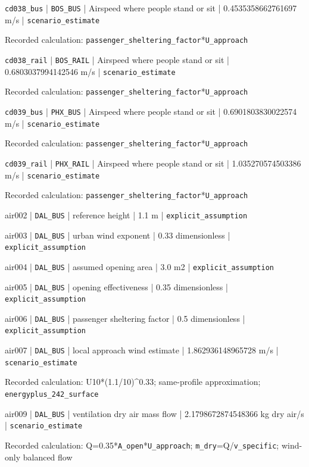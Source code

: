 \nolinkurl{cd038_bus} | \nolinkurl{BOS_BUS} | Airspeed where people stand or sit | 0.4535358662761697 m/s | \nolinkurl{scenario_estimate}

Recorded calculation: \nolinkurl{passenger_sheltering_factor}*\nolinkurl{U_approach}

\nolinkurl{cd038_rail} | \nolinkurl{BOS_RAIL} | Airspeed where people stand or sit | 0.6803037994142546 m/s | \nolinkurl{scenario_estimate}

Recorded calculation: \nolinkurl{passenger_sheltering_factor}*\nolinkurl{U_approach}

\nolinkurl{cd039_bus} | \nolinkurl{PHX_BUS} | Airspeed where people stand or sit | 0.6901803830022574 m/s | \nolinkurl{scenario_estimate}

Recorded calculation: \nolinkurl{passenger_sheltering_factor}*\nolinkurl{U_approach}

\nolinkurl{cd039_rail} | \nolinkurl{PHX_RAIL} | Airspeed where people stand or sit | 1.035270574503386 m/s | \nolinkurl{scenario_estimate}

Recorded calculation: \nolinkurl{passenger_sheltering_factor}*\nolinkurl{U_approach}

air002 | \nolinkurl{DAL_BUS} | reference height | 1.1 m | \nolinkurl{explicit_assumption}

air003 | \nolinkurl{DAL_BUS} | urban wind exponent | 0.33 dimensionless | \nolinkurl{explicit_assumption}

air004 | \nolinkurl{DAL_BUS} | assumed opening area | 3.0 m2 | \nolinkurl{explicit_assumption}

air005 | \nolinkurl{DAL_BUS} | opening effectiveness | 0.35 dimensionless | \nolinkurl{explicit_assumption}

air006 | \nolinkurl{DAL_BUS} | passenger sheltering factor | 0.5 dimensionless | \nolinkurl{explicit_assumption}

air007 | \nolinkurl{DAL_BUS} | local approach wind estimate | 1.862936148965728 m/s | \nolinkurl{scenario_estimate}

Recorded calculation: U10*(1.1/10)\textasciicircum{}0.33; same-profile approximation; \nolinkurl{energyplus_242_surface}

air009 | \nolinkurl{DAL_BUS} | ventilation dry air mass flow | 2.1798672874548366 kg dry air/s | \nolinkurl{scenario_estimate}

Recorded calculation: Q=0.35*\nolinkurl{A_open}*\nolinkurl{U_approach}; \nolinkurl{m_dry}=Q/\nolinkurl{v_specific}; wind-only balanced flow

